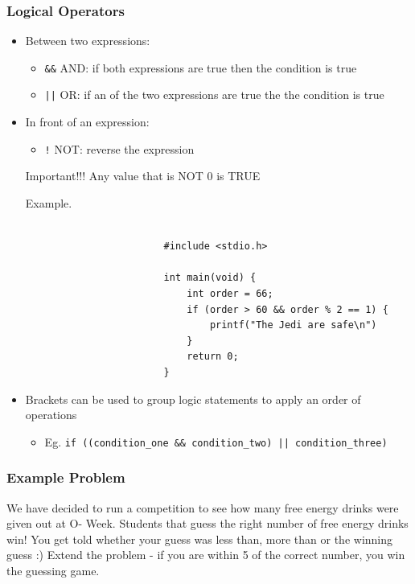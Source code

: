 \documentclass{article}
\begin{document}
		\subsubsection{Logical Operators}
			\begin{itemize}
				\item Between two expressions:
					\begin{itemize}
						\item \texttt{&&} AND: if both expressions are true then the condition is true
						\item \texttt{||} OR: if an of the two expressions are true the the condition is true
					\end{itemize}
				\item In front of an expression:
					\begin{itemize}
						\item \texttt{!} NOT: reverse the expression
					\end{itemize}

				\begin{question}{Important!!!}
					\textcolor{pastel_red}{Any value that is NOT 0 is TRUE}
				\end{question}

				\begin{question}{Example.}
					\begin{verbatim}

						#include <stdio.h>

						int main(void) {
							int order = 66;
							if (order > 60 && order % 2 == 1) {
								printf("The Jedi are safe\n")
							}
							return 0;
						}

					\end{verbatim}
				\end{question}
				
			\item Brackets can be used to group logic statements to apply an order of operations
				\begin{itemize}
					\item Eg. \texttt{if ((condition_one && condition_two) || condition_three)}
				\end{itemize}
			\end{itemize}

		\subsubsection{Example Problem}
			We have decided to run a competition to see how many free energy drinks were given out at O- Week. Students that guess the right number of free energy drinks win! You get told whether your guess was less than, more than or the winning guess :)
			Extend the problem - if you are within 5 of the correct number, you win the guessing game.
\end{document}
